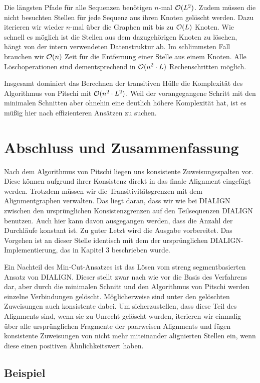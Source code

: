 Die längsten Pfade für alle Sequenzen benötigen $n$-mal $\mathcal{O}(L^2)$. Zudem müssen die nicht besuchten Stellen für jede Sequenz aus ihren Knoten gelöscht werden. Dazu iterieren wir wieder $n$-mal über die Graphen mit bis zu $\mathcal{O}(L)$ Knoten. Wie schnell es möglich ist die Stellen aus dem dazugehörigen Knoten zu löschen, hängt von der intern verwendeten Datenstruktur ab. Im schlimmsten Fall brauchen wir $\mathcal{O}(n)$ Zeit für die Entfernung einer Stelle aus einem Knoten. Alle Löschoperationen sind dementsprechend in $\mathcal{O}(n^2\cdot L)$ Rechenschritten möglich.

Insgesamt dominiert das Berechnen der transitiven Hülle die Komplexität des Algorithmus von Pitschi mit $\mathcal{O}(n^2\cdot L^2)$. Weil der vorangegangene Schritt mit den minimalen Schnitten aber ohnehin eine deutlich höhere Komplexität hat, ist es müßig hier nach effizienteren Ansätzen zu suchen. 

\section{Abschluss und Zusammenfassung}

Nach dem Algorithmus von Pitschi liegen uns konsistente Zuweisungsspalten vor. Diese können aufgrund ihrer Konsistenz direkt in das finale Alignment eingefügt werden. Trotzdem müssen wir die Transitivitätsgrenzen mit dem Alignmentgraphen verwalten. Das liegt daran, dass wir wie bei DIALIGN zwischen den ursprünglichen Konsistenzgrenzen auf den Teilsequenzen DIALIGN benutzen. Auch hier kann davon ausgegangen werden, dass die Anzahl der Durchläufe konstant ist. Zu guter Letzt wird die Ausgabe vorbereitet. Das Vorgehen ist an dieser Stelle identisch mit dem der ursprünglichen DIALIGN-Implementierung, das in Kapitel 3 beschrieben wurde.

Ein Nachteil des Min-Cut-Ansatzes ist das Lösen vom streng segmentbasierten Ansatz von DIALIGN. Dieser stellt zwar nach wie vor die Basis des Verfahrens dar, aber durch die minimalen Schnitt und den Algorithmus von Pitschi werden einzelne Verbindungen gelöscht. Möglicherweise sind unter den gelöschten Zuweisungen auch konsistente dabei. Um sicherzustellen, dass diese Teil des Alignments sind, wenn sie zu Unrecht gelöscht wurden, iterieren wir einmalig über alle ursprünglichen Fragmente der paarweisen Alignments und fügen konsistente Zuweisungen von nicht mehr miteinander alignierten Stellen ein, wenn diese einen positiven Ähnlichkeitswert haben. 

\subsection{Beispiel}

